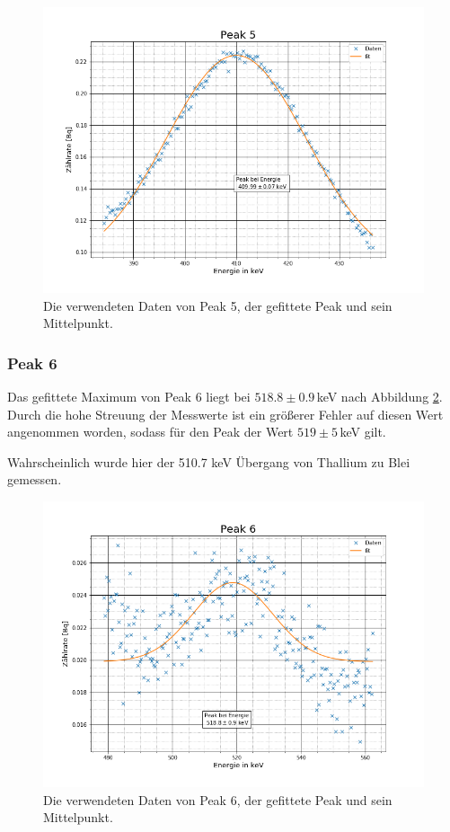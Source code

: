 \begin{figure}[h]
	\centering
	\includegraphics[scale=0.7]{Bilder/Anhang/P5}
	\caption[Thorium Peak 5]{\small Die verwendeten Daten von Peak 5, der gefittete Peak und sein Mittelpunkt.}
	\label{p5}
\end{figure}

\subsubsection{Peak 6}
Das gefittete Maximum von Peak 6 liegt bei $518.8\pm0.9\,$keV nach Abbildung \ref{p6}. Durch die hohe Streuung der Messwerte ist ein größerer Fehler auf diesen Wert angenommen worden, sodass für den Peak der Wert $519\pm5\,$keV gilt.\par
Wahrscheinlich wurde hier der 510.7 keV \cite{Thallium} Übergang von Thallium zu Blei gemessen.

\begin{figure}[h]
	\centering
	\includegraphics[scale=0.7]{Bilder/Anhang/P6}
	\caption[Thorium Peak 6]{\small Die verwendeten Daten von Peak 6, der gefittete Peak und sein Mittelpunkt.}
	\label{p6}
\end{figure}
